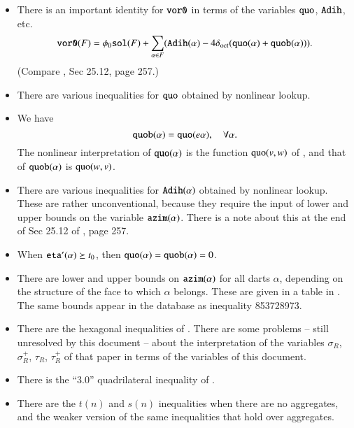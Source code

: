\begin{itemize}
    \item There is an important identity for ${\operatorname{{\texttt{vor0}}}}$ in terms of the
    variables ${\operatorname{{\texttt{quo}}}}$, ${\operatorname{{\texttt{Adih}}}}$, etc.
    \begin{equation}
    {\operatorname{{\texttt{vor0}}}}(F) = \phi_0 {\operatorname{{\texttt{sol}}}}(F) +\sum_{\alpha\in F}
    ({\operatorname{{\texttt{Adih}}}}(\alpha) - 4\delta_{\operatorname{oct}}({\operatorname{{\texttt{quo}}}}(\alpha)
    +{\operatorname{{\texttt{quob}}}}(\alpha))).
    \end{equation}
    (Compare \cite{DCG}, Sec 25.12, page 257.)
%
    \item There are various inequalities for ${\operatorname{{\texttt{quo}}}}$ obtained
    by nonlinear lookup.
%
    \item We have
        \begin{equation}
        {\operatorname{{\texttt{quob}}}}(\alpha) = {\operatorname{{\texttt{quo}}}}(e\alpha),\quad
        \forall\alpha.
        \end{equation}
    The nonlinear interpretation of ${\operatorname{{\texttt{quo}}}}(\alpha)$ is
    the function ${\operatorname{quo}}(v,w)$ of \cite{DCG}, and that of
    ${\operatorname{{\texttt{quob}}}}(\alpha)$ is ${\operatorname{quo}}(w,v)$.
%
    \item There are various inequalities for ${\operatorname{{\texttt{Adih}}}}(\alpha)$
    obtained by nonlinear lookup.  These are rather
    unconventional, because they require the input of lower and
    upper bounds on the variable ${\operatorname{{\texttt{azim}}}}(\alpha)$.  There is
    a note about this at the end of Sec 25.12 of \cite{DCG}, page 257.
%
    \item When ${\operatorname{{\texttt{eta}}}}'(\alpha)\succeq t_0$, then ${\operatorname{{\texttt{quo}}}}(\alpha)
    = {\operatorname{{\texttt{quob}}}}(\alpha)=0$.
    \item There are lower and upper bounds on ${\operatorname{{\texttt{azim}}}}(\alpha)$ for all
    darts $\alpha$, depending on the structure of the face to
    which $\alpha$ belongs.  These are given in a table in
    \cite[VI,p.54]{Hal98d}.  The same bounds appear in the database as
    inequality 853728973.
    \item There are the hexagonal inequalities of \cite[25.13]{DCG}.
  There are some problems -- still unresolved by this document --
  about the interpretation of the variables $\sigma_R$,
  $\sigma_R^+$, $\tau_R$, $\tau_R^+$ of that paper in terms of the variables
  of this document.
  \item There is the ``$3.0$'' quadrilateral inequality of
  \cite[Sec.25.10]{DCG}.
  \item There are the $t(n)$ and $s(n)$ inequalities when there
  are no aggregates, and the weaker version of the same
  inequalities that hold over aggregates.
\end{itemize}

